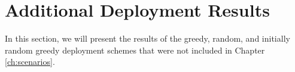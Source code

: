 \chapter{Additional Deployment Results}
\label{ch:additional_results}

In this section, we will present the results of the greedy, random, and initially random greedy deployment schemes that were not included in Chapter \ref{ch:scenarios}.